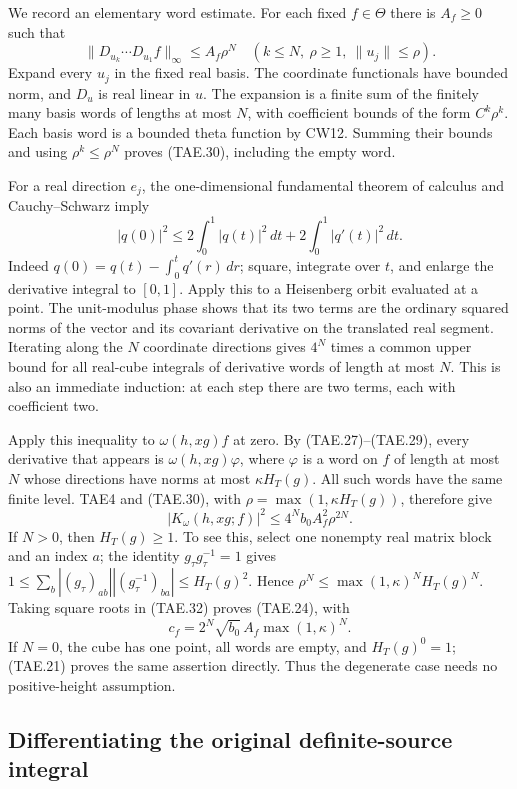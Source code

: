 We record an elementary word estimate.  For each fixed
\(f\in\Theta\) there is \(A_f\ge0\) such that
\[
 \|D_{u_k}\cdots D_{u_1}f\|_\infty
        \le A_f\rho^N
 \quad\left(k\le N,\ \rho\ge1,\ \|u_j\|\le\rho\right).
 \tag{TAE.30}
\]
Expand every \(u_j\) in the fixed real basis.  The coordinate
functionals have bounded norm, and \(D_u\) is real linear in
\(u\).  The expansion is a finite sum of the finitely many
basis words of lengths at most \(N\), with coefficient bounds
of the form \(C^k\rho^k\).  Each basis word is a bounded theta
function by CW12.  Summing their bounds and using
\(\rho^k\le\rho^N\) proves (TAE.30), including the empty word.

For a real direction \(e_j\), the one-dimensional fundamental
theorem of calculus and Cauchy--Schwarz imply
\[
 |q(0)|^2\le
       2\int_0^1|q(t)|^2\,dt+
       2\int_0^1|q'(t)|^2\,dt .
 \tag{TAE.31}
\]
Indeed \(q(0)=q(t)-\int_0^tq'(r)\,dr\); square, integrate
over \(t\), and enlarge the derivative integral to \([0,1]\).
Apply this to a Heisenberg orbit evaluated at a point.
The unit-modulus phase shows that its two terms are the
ordinary squared norms of the vector and its covariant
derivative on the translated real segment.  Iterating along
the \(N\) coordinate directions gives \(4^N\) times a common
upper bound for all real-cube integrals of derivative words
of length at most \(N\).  This is also an immediate induction:
at each step there are two terms, each with coefficient two.

Apply this inequality to \(\omega(h,xg)f\) at zero.
By (TAE.27)--(TAE.29), every derivative that appears is
\(\omega(h,xg)\varphi\), where \(\varphi\) is a word on \(f\)
of length at most \(N\) whose directions have norms at most
\(\kappa H_T(g)\).  All such words have the same finite
level.  TAE4 and (TAE.30), with
\(\rho=\max(1,\kappa H_T(g))\), therefore give
\[
 |K_\omega(h,xg;f)|^2
        \le 4^N b_0 A_f^2\rho^{2N}.
 \tag{TAE.32}
\]
If \(N>0\), then \(H_T(g)\ge1\).  To see this, select one
nonempty real matrix block and an index \(a\); the identity
\(g_\tau g_\tau^{-1}=1\) gives
\(1\le\sum_b |(g_\tau)_{ab}||(g_\tau^{-1})_{ba}|
 \le H_T(g)^2\).
Hence
\(\rho^N\le\max(1,\kappa)^N H_T(g)^N\).
Taking square roots in (TAE.32) proves (TAE.24), with
\[
       c_f=2^N\sqrt{b_0}\,A_f\max(1,\kappa)^N .
 \tag{TAE.33}
\]
If \(N=0\), the cube has one point, all words are empty, and
\(H_T(g)^0=1\); (TAE.21) proves the same assertion directly.
Thus the degenerate case needs no positive-height assumption.

\subsection*{Differentiating the original definite-source integral}

